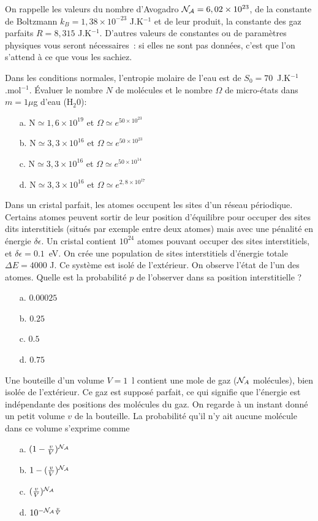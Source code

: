 On rappelle les valeurs du nombre d'Avogadro ${\cal N_A}=6,02 \times 10^{23}$, de la constante de Boltzmann $k_B=1,38 \times 10^{-23}$ J.K$^{-1}$ et de leur produit, la constante des gaz parfaits $R=8,315$ J.K$^{-1}$. D'autres valeurs de constantes ou de paramètres physiques vous seront nécessaires~: si elles ne sont pas données, c'est que l'on s'attend à ce que vous les sachiez.

\question
Dans les conditions normales, l'entropie molaire de l'eau est de $S_0 = 70$~J.K$^{-1}$.mol$^{-1}$. Évaluer le nombre $N$ de molécules et le nombre $\Omega$ de micro-états dans $ m=1 \mu$g d'eau (H$_2$0):
\begin{itemize}
\item[a. ] N$\simeq 1,6 \times 10^{19}$ et  $\Omega \simeq e^{50\times 10^{23}}$
\item[b. ] N$\simeq 3,3 \times 10^{16}$ et  $\Omega \simeq e^{50\times 10^{23}}$
\item[c. ] N$\simeq 3,3 \times 10^{16}$ et  $\Omega \simeq e^{50 \times 10^{14}}$
\item[d. ] N$\simeq 3,3 \times 10^{16}$ et  $\Omega \simeq e^{2,8\times 10^{17}}$
\end{itemize}

\question
Dans un cristal parfait, les atomes occupent les sites d'un réseau périodique. Certains atomes peuvent sortir de leur position d'équilibre pour occuper des sites dits interstitiels (situés par exemple entre deux atomes) mais avec une pénalité en énergie $\delta \epsilon$. Un cristal contient $10^{24}$ atomes pouvant occuper des sites interstitiels, et $\delta \epsilon =0.1$~eV. On crée une population de sites interstitiels d'énergie totale $\Delta E=4000$ J. Ce système est isolé de l'extérieur. On observe l'état de l'un des atomes. Quelle est la probabilité $p$ de l'observer dans sa position interstitielle ?
	
\begin{itemize}
\item[a.] $0.00025$
\item[b.] $0.25$
\item[c.] $0.5$ 
\item[d.] $0.75$
\end{itemize}

\question
Une bouteille d'un volume $V=1$~l contient une mole de gaz (${\cal N}_A$ molécules), bien isolée de l'extérieur. Ce gaz est supposé parfait, ce qui signifie que l'énergie est indépendante des positions des molécules du gaz. On regarde à un instant donné un petit volume $v$ de la bouteille. La probabilité qu'il n'y ait aucune molécule dans ce volume s'exprime comme
\begin{itemize}
\item[a.] $(1-\frac{v}{V})^{\cal N_A}$
\item[b.] $1-(\frac{v}{V})^{\cal N_A}$
\item[c.] $(\frac{v}{V})^{\cal N_A}$
\item[d.] $10^{-{\cal N_A} \frac{v}{V}}$
\end{itemize}	

